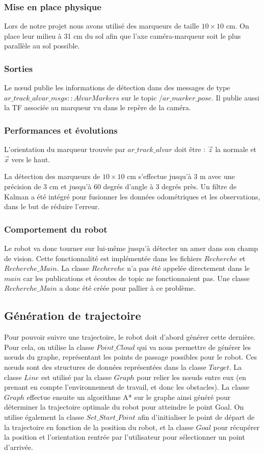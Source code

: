 \documentclass[10pt,a4paper]{article}
\begin{document}
\subsubsection{Mise en place physique} 
Lors de notre projet nous avons utilisé des marqueurs de taille $10 \times 10$ cm. On place leur milieu à 31 cm du sol afin que l'axe caméra-marqueur soit le plus parallèle au sol possible.

\subsubsection{Sorties}
Le nœud publie les informations de détection dans des messages de type $ar\_track\_alvar\_msgs::AlvarMarkers$ sur le topic $/ar\_marker\_pose$. Il publie aussi la TF associée au marqueur vu dans le repère de la caméra.
	
\subsubsection{Performances et évolutions}
L'orientation du marqueur trouvée par $ar\_track\_alvar$ doit être : $\vec{z}$ la normale et $\vec{x}$ vers le haut.
	
La détection des marqueurs de $10 \times 10$ cm s'effectue jusqu'à 3 m  avec une précision de 3 cm et jusqu'à 60 degrés d'angle à 3 degrés près. Un filtre de Kalman a été intégré pour fusionner les données odométriques et les observations, dans le but de réduire l'erreur.

\subsubsection{Comportement du robot}
Le robot va donc tourner sur lui-même jusqu'à détecter un amer dans son champ de vision. Cette fonctionnalité est implémentée dans les fichiers $Recherche$ et $Recherche\_Main$. La classe $Recherche$ n'a pas été appelée directement dans le $main$ car les publications et écoutes de topic ne fonctionnaient pas. Une classe $Recherche\_Main$ a donc été créée pour pallier à ce problème.


\subsection{Génération de trajectoire}
\label{sec:generation}

Pour pouvoir suivre une trajectoire, le robot doit d'abord générer cette dernière. Pour cela, on utilise la classe $Point\_Cloud$ qui va nous permettre de générer les nœuds du graphe, représentant les points de passage possibles pour le robot. Ces nœuds sont des structures de données représentées dans la classe $Target$. La classe $Line$ est utilisé par la classe $Graph$ pour relier les nœuds entre eux (en prenant en compte l'environnement de travail, et donc les obstacles). La classe $Graph$ effectue ensuite un algorithme A* sur le graphe ainsi généré pour déterminer la trajectoire optimale du robot pour atteindre le point Goal. On utilise également la classe $Set\_Start\_Point$ afin d'initialiser le point de départ de la trajectoire en fonction de la position du robot, et la classe $Goal$ pour récupérer la position et l'orientation rentrée par l'utilisateur pour sélectionner un point d'arrivée.
\end{document}

